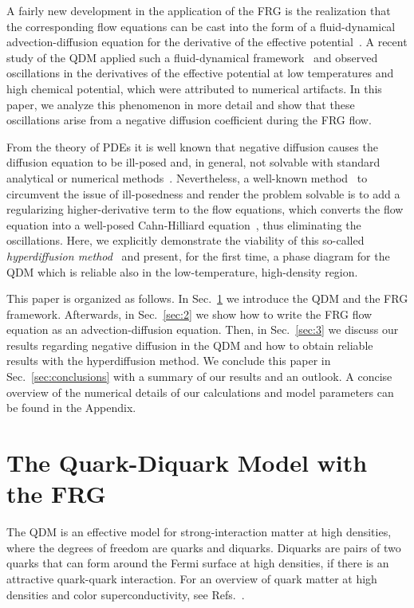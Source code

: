 \documentclass[
onecolumn,
aps,
prd,
amsmath,
amssymb,
nofootinbib
]{revtex4-2}
\begin{document}
A fairly new development in the application of the FRG is the realization that the corresponding flow equations can be cast into the form of a fluid-dynamical advection-diffusion equation for the derivative of the effective potential~\cite{Grossi:2019urj,Koenigstein:2021syz}.
A recent study of the QDM applied such a fluid-dynamical framework~\cite{stoll2025nonperturbative} and observed oscillations in the derivatives of the effective potential at low temperatures and high chemical potential, which were attributed to numerical artifacts. 
In this paper, we analyze this phenomenon in more detail and show that these oscillations arise from a negative diffusion coefficient during the FRG flow. 

From the theory of PDEs it is well known that negative diffusion causes the diffusion equation to be ill-posed and, in general, not solvable with standard analytical or numerical methods~\cite{Tikhonov1995}.
Nevertheless, a well-known method~\cite{witelski1995shocks,miller2025shock,Maron:2008sb} to circumvent the issue of ill-posedness and render the problem solvable is to add a regularizing higher-derivative term to the flow equations, which converts the flow equation into a well-posed Cahn-Hilliard equation~\cite{CahnHilliard}, thus eliminating the oscillations.
Here, we explicitly demonstrate the viability of this so-called \textit{hyperdiffusion method}~\cite{Maron:2008sb} and present, for the first time, a phase diagram for the QDM which is reliable also in the low-temperature, high-density region.

This paper is organized as follows.
In Sec.~\ref{sec:1} we introduce the QDM and the FRG framework. Afterwards, in Sec.~\ref{sec:2} we  show how to write the FRG flow equation as an advection-diffusion equation. 
Then, in Sec.~\ref{sec:3} we discuss our results regarding negative diffusion in the QDM and how to obtain reliable results with the hyperdiffusion method.
We conclude this paper in Sec.~\ref{sec:conclusions} with a summary of our results and an outlook.
A concise overview of the numerical details of our calculations and model parameters can be found in the Appendix.

\section{The Quark-Diquark Model with the FRG}\label{sec:1}


The QDM is an effective model for strong-interaction matter at high densities, where the degrees of freedom are quarks and diquarks. 
Diquarks are pairs of two quarks that can form around the Fermi surface at high densities, if there is an attractive quark-quark interaction. 
For an overview of quark matter at high densities and color superconductivity, see Refs.~\cite{bailin1979superfluid,rischke2004quark,buballa2005njl,Alford:2007xm}.
\end{document}
